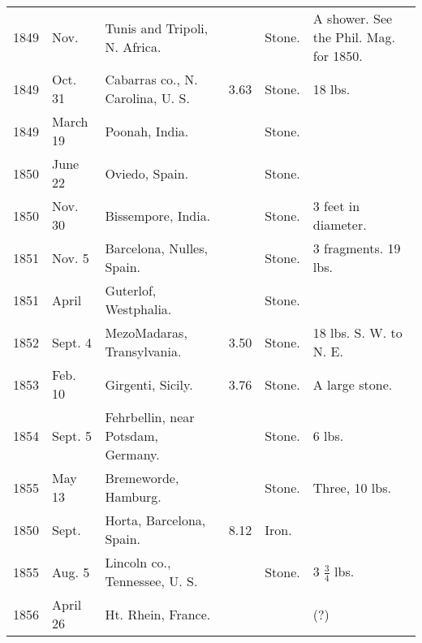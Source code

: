 \documentclass[a4paper, 12pt, oneside]{article}
\begin{document}
\begin{center}
\begin{longtable}{|p{10mm}|p{15mm}|p{32mm}|p{13mm}|p{13mm}|p{26mm}|}
        1849 & Nov. & Tunis and Tripoli, N. Africa. & ~ & Stone. & A shower. See the Phil. Mag. for 1850. \\
        1849 & Oct. 31 & Cabarras co., N. Carolina, U. S. & 3.63 & Stone. & 18 lbs. \\
        1849 & March 19 & Poonah, India. & ~ & Stone. & ~ \\
        1850 & June 22 & Oviedo, Spain. & ~ & Stone. & ~ \\
        1850 & Nov. 30 & Bissempore, India. & ~ & Stone. & 3 feet in diameter. \\
        1851 & Nov. 5 & Barcelona, Nulles, Spain. & ~ & Stone. & 3 fragments. 19 lbs. \\
        1851 & April & Guterlof, Westphalia. & ~ & Stone. & ~ \\
        1852 & Sept. 4 & Mezo\-Madaras, Transylvania. & 3.50 & Stone. & 18 lbs. S. W. to N. E. \\
        1853 & Feb. 10 & Girgenti, Sicily. & 3.76 & Stone. & A large stone. \\
        1854 & Sept. 5 & Fehrbellin, near Potsdam, Germany. & ~ & Stone. & 6 lbs. \\
        1855 & May 13 & Bremeworde, Hamburg. & ~ & Stone. & Three, 10 lbs. \\
        1850 & Sept. & Horta, Barcelona, Spain. & 8.12 & Iron. & ~ \\
        1855 & Aug. 5 & Lincoln co., Tennessee, U. S. & ~ & Stone. & 3 $\frac{3}{4}$ lbs. \\
        1856 & April 26 & Ht. Rhein, France. & ~ & ~ & (?) \\ \hline
    \end{longtable}
\end{center}
\clearpage
\end{document}
